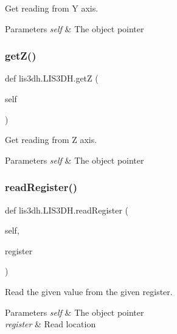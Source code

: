 Get reading from Y axis. 


\begin{DoxyParams}{Parameters}
{\em self} & The object pointer \\
\hline
\end{DoxyParams}
\mbox{\label{classlis3dh_1_1_l_i_s3_d_h_a6750df0cbf304ab3594fcbeb2e691918}} 
\subsubsection{\texorpdfstring{get\+Z()}{getZ()}}
{\footnotesize\ttfamily def lis3dh.\+L\+I\+S3\+D\+H.\+getZ (\begin{DoxyParamCaption}\item[{}]{self }\end{DoxyParamCaption})}



Get reading from Z axis. 


\begin{DoxyParams}{Parameters}
{\em self} & The object pointer \\
\hline
\end{DoxyParams}
\mbox{\label{classlis3dh_1_1_l_i_s3_d_h_a5befd55648de38dcd3d0a3b576b88e34}} 
\subsubsection{\texorpdfstring{read\+Register()}{readRegister()}}
{\footnotesize\ttfamily def lis3dh.\+L\+I\+S3\+D\+H.\+read\+Register (\begin{DoxyParamCaption}\item[{}]{self,  }\item[{}]{register }\end{DoxyParamCaption})}



Read the given value from the given register. 


\begin{DoxyParams}{Parameters}
{\em self} & The object pointer \\
\hline
{\em register} & Read location \\
\hline
\end{DoxyParams}
\mbox{\label{classlis3dh_1_1_l_i_s3_d_h_a5c1dbf97af7b1f8c7928e979935722cd}} 
